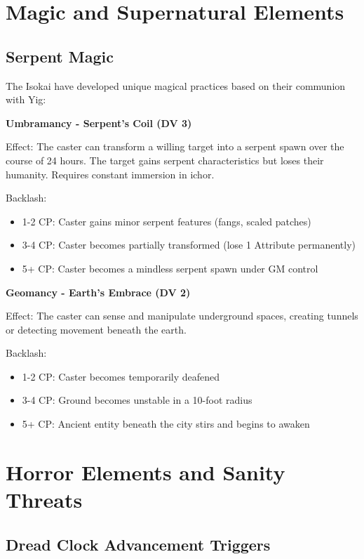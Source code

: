 \documentclass[12pt,twoside]{article}
\newenvironment{adventurebox}[1]{
  \begin{mdframed}[
    linewidth=2pt,
    linecolor=serpentgreen,
    backgroundcolor=gray!10,
    innertopmargin=10pt,
    innerbottommargin=10pt,
    innerrightmargin=10pt,
    innerleftmargin=10pt
  ]
  \textbf{#1}
}{\end{mdframed}}
\begin{document}
\section{Magic and Supernatural Elements}

\subsection{Serpent Magic}

The Isokai have developed unique magical practices based on their communion with Yig:

\begin{adventurebox}{Umbramancy - Serpent's Coil (DV 3)}
Effect: The caster can transform a willing target into a serpent spawn over the course of 24 hours. The target gains serpent characteristics but loses their humanity. Requires constant immersion in ichor.

Backlash:
\begin{itemize}
  \item 1-2 CP: Caster gains minor serpent features (fangs, scaled patches)
  \item 3-4 CP: Caster becomes partially transformed (lose 1 Attribute permanently)
  \item 5+ CP: Caster becomes a mindless serpent spawn under GM control
\end{itemize}
\end{adventurebox}

\begin{adventurebox}{Geomancy - Earth's Embrace (DV 2)}
Effect: The caster can sense and manipulate underground spaces, creating tunnels or detecting movement beneath the earth.

Backlash:
\begin{itemize}
  \item 1-2 CP: Caster becomes temporarily deafened
  \item 3-4 CP: Ground becomes unstable in a 10-foot radius
  \item 5+ CP: Ancient entity beneath the city stirs and begins to awaken
\end{itemize}
\end{adventurebox}

\section{Horror Elements and Sanity Threats}

\subsection{Dread Clock Advancement Triggers}
\end{document}
